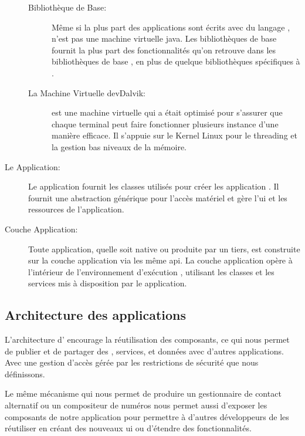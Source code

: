 \begin{description}
\begin{description}
\item [Bibliothèque de Base:]

Même si la plus part des applications \android{} sont écrits avec du langage
,  n'est pas une machine virtuelle java. Les bibliothèques
\android{} de base fournit la plus part des fonctionnalités qu'on retrouve
dans les bibliothèques de base , en plus de quelque bibliothèques
spécifiques à \android{}.

\item [La Machine Virtuelle dev{Dalvik}:]

 est une machine virtuelle qui a était optimisé pour
s'assurer que chaque terminal peut faire fonctionner plusieurs instance
d'une manière efficace. Il s’appuie sur le Kernel Linux pour le
threading et la gestion bas niveaux de la mémoire.

\end{description}

\item [Le \en{Framework} Application:]

Le  application fournit les classes utilisés pour créer les application \android{}. Il fournit une abstraction générique pour l’accès matériel et gère l'\gls{ui} et les ressources de l'application.

\item [Couche Application:]

Toute application, quelle soit native ou produite par un tiers, est
construite sur la couche application via les même \gls{api}. La couche
application opère à l'intérieur de l'environnement d’exécution \android{},
utilisant les classes et les services mis à disposition par le 
application.

\end{description}

\subsection[Architecture des applications \android{}]{Architecture des applications \android{}\cite{pa4ad:chptr1}}

L'architecture d'\android{} encourage la réutilisation des composants,
ce qui nous permet de publier et de partager des ,
services, et données avec d'autres applications. Avec une gestion
d'accès gérée par les restrictions de sécurité que nous définissons.

Le même mécanisme qui nous permet de produire un gestionnaire de contact alternatif ou un compositeur de numéros nous permet aussi d'exposer les composants de notre application pour permettre à d'autres développeurs de les réutiliser en créant des nouveaux \gls{ui} ou d’étendre des fonctionnalités.

